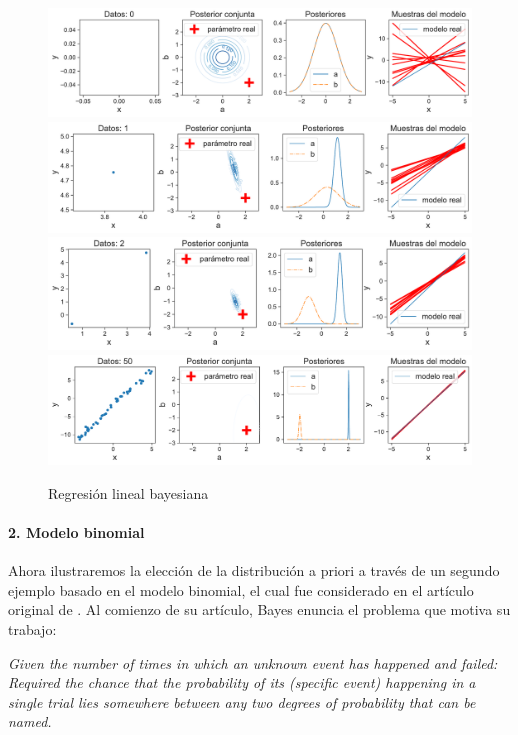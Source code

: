 \begin{mdframed}[style=ejemplo, frametitle={\center Ejemplo: distribución posterior del modelo lineal y gaussiano}]
\begin{minipage}[t]{0.65\textwidth}
\begin{figure}[H]
	\includegraphics[width=\textwidth,frame]{img/cap2_bayesian_lin_reg_0.pdf}\\
	\includegraphics[width=\textwidth,frame]{img/cap2_bayesian_lin_reg_1.pdf}\\
	\includegraphics[width=\textwidth,frame]{img/cap2_bayesian_lin_reg_2.pdf}\\
	\includegraphics[width=\textwidth,frame]{img/cap2_bayesian_lin_reg_50.pdf}
	\caption{Regresión lineal bayesiana}
	\label{fig:bayesian_lin_reg}
\end{figure}
\end{minipage}

\end{mdframed}

\paragraph{2. Modelo binomial}

Ahora ilustraremos la elección de la distribución a priori a través de un segundo ejemplo basado en el modelo binomial, el cual fue considerado en el artículo original de \cite{bayes}. Al comienzo de su artículo, Bayes enuncia el problema que motiva su trabajo: 
\begin{center}
\it
Given the number of times in which an unknown event has happened and
failed: Required the chance that the probability of its (specific event)
happening in a single trial lies somewhere between any two degrees of
probability that can be named.
\end{center}

